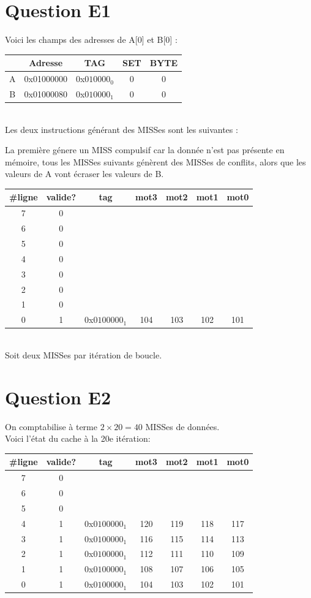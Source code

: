 \documentclass[10pt]{article}
\begin{document}
\section{Question E1}
Voici les champs des adresses de A[0] et B[0] :\\
\begin{tabular}{|c|c|c|c|c|}
  \hline
 & Adresse & TAG & SET & BYTE \\ \hline
 A & 0x01000000 & 0x$010000_0$ & 0 & 0 \\ \hline
 B & 0x01000080 & 0x$010000_1$ & 0 & 0 \\ \hline
\end{tabular}\\
Les deux instructions générant des MISSes sont les suivantes :

La première génere un MISS compulsif car la donnée n'est pas présente en
mémoire, tous les MISSes suivants génèrent des MISSes de conflits, alors que
les valeurs de A vont écraser les valeurs de B.\\
\begin{tabular}{|c|c|c|c|c|c|c|}
  \hline
  \#ligne & valide? & tag & mot3 & mot2 & mot1 & mot0 \\ \hline
  7 & 0 & & & & & \\ \hline
  6 & 0 & & & & & \\ \hline
  5 & 0 & & & & & \\ \hline
  4 & 0 & & & & & \\ \hline
  3 & 0 & & & & & \\ \hline
  2 & 0 & & & & & \\ \hline
  1 & 0 & & & & & \\ \hline
  0 & 1 & 0x$0100000_1$ & 104 & 103 & 102 & 101 \\ \hline
\end{tabular}\\
Soit deux MISSes par itération de boucle.

\section{Question E2}
On comptabilise à terme ${2}\times{20}={40}$ MISSes de données.\\Voici l'état du
cache à la 20e itération:\\
\begin{tabular}{|c|c|c|c|c|c|c|}
  \hline
  \#ligne & valide? & tag & mot3 & mot2 & mot1 & mot0 \\ \hline
  7 & 0 & & & & & \\ \hline
  6 & 0 & & & & & \\ \hline
  5 & 0 & & & & & \\ \hline
  4 & 1 & 0x$0100000_1$ & 120 & 119 & 118 & 117 \\ \hline
  3 & 1 & 0x$0100000_1$ & 116 & 115 & 114 & 113 \\ \hline
  2 & 1 & 0x$0100000_1$ & 112 & 111 & 110 & 109 \\ \hline
  1 & 1 & 0x$0100000_1$ & 108 & 107 & 106 & 105 \\ \hline
  0 & 1 & 0x$0100000_1$ & 104 & 103 & 102 & 101 \\ \hline
\end{tabular}
\end{document}
